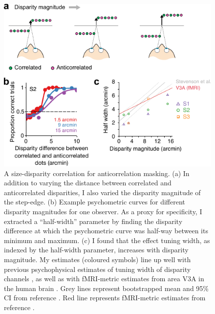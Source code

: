 \begin{figure}
  \centering
  \includegraphics{Fig4}
  \caption[A size-disparity correlation for anticorrelation masking.]{A size-disparity correlation for anticorrelation masking. (a) In addition to varying the distance between correlated and anticorrelated disparities, I also varied the disparity magnitude of the step-edge. (b) Example psychometric curves for different disparity magnitudes for one observer. As a proxy for specificity, I extracted a ``half-width'' parameter by finding the disparity difference at which the psychometric curve was half-way between its minimum and maximum. (c) I found that the effect tuning width, as indexed by the half-width parameter, increases with disparity magnitude. My estimates (coloured symbols) line up well with previous psychophysical estimates of tuning width of disparity channels \cite{Stevenson:1992kx}, as well as with fMRI-metric estimates from area V3A in the human brain \cite{Goncalves:2015aa}. Grey lines represent bootstrapped mean and 95\% CI from reference \cite{Stevenson:1992kx}. Red line represents fMRI-metric estimates from reference \cite{Goncalves:2015aa}.}
  \label{fig:c2f4}
\end{figure}


